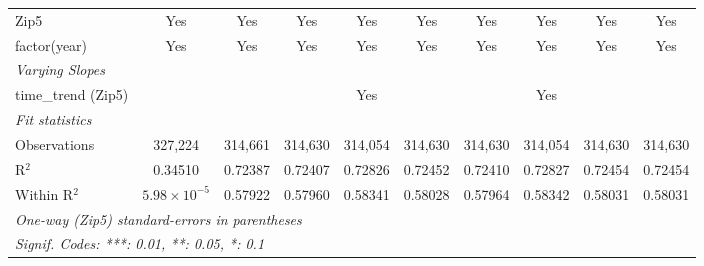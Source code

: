 \begin{table}[H]
{\begin{tabular}{lccccccccc}
 Zip5 & Yes & Yes & Yes & Yes & Yes & Yes & Yes & Yes & Yes\\ 

 factor(year) & Yes & Yes & Yes & Yes & Yes & Yes & Yes & Yes & Yes\\ 

 \midrule \emph{Varying Slopes}&   &   &   &   &   &   &   &   &  \\ 

 time\_trend (Zip5) &  &  &  & Yes &  &  & Yes &  & \\ 

 \midrule \emph{Fit statistics}&  & & & & & & & & \\ 

 Observations & 327,224&314,661&314,630&314,054&314,630&314,630&314,054&314,630&314,630\\ 

 R$^2$ & 0.34510&0.72387&0.72407&0.72826&0.72452&0.72410&0.72827&0.72454&0.72454\\ 

 Within R$^2$ & $5.98\times 10^{-5}$&0.57922&0.57960&0.58341&0.58028&0.57964&0.58342&0.58031&0.58031\\ 

 \midrule\midrule\multicolumn{10}{l}{\emph{One-way (Zip5) standard-errors in parentheses}}\\ 

 \multicolumn{10}{l}{\emph{Signif. Codes: ***: 0.01, **: 0.05, *: 0.1}}\\ 

 \end{tabular}} 

 \end{table} 

  

